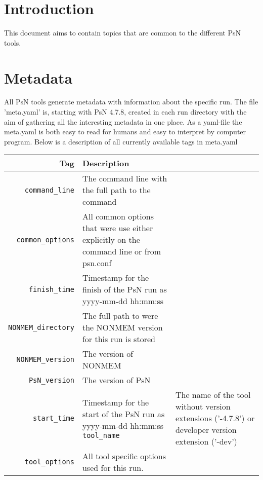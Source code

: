 

\usepackage{tabularx}





\maketitle
\newcommand{\guidetoolname}{<toolname>}

\section{Introduction}
This document aims to contain topics that are common to the different PsN tools.

\section{Metadata}
All PsN tools generate metadata with information about the specific run. The file 'meta.yaml' is, starting with PsN 4.7.8, created in each run directory with the aim of gathering all the interesting metadata in one place. As a yaml-file the meta.yaml is both easy to read for humans and easy to interpret by computer program. Below is a description of all currently available tags in meta.yaml

\begin{center}
    \begin{tabularx}{\linewidth}{ r X }
    \hline
    Tag & Description \\ \hline
    \verb|command_line| & The command line with the full path to the command \\ \hline
    \verb|common_options| & All common options that were use either explicitly on the command line or from psn.conf \\ \hline
    \verb|finish_time| & Timestamp for the finish of the PsN run as yyyy-mm-dd hh:mm:ss \\ \hline
    \verb|NONMEM_directory| & The full path to were the NONMEM version for this run is stored \\ \hline
    \verb|NONMEM_version| & The version of NONMEM \\ \hline
    \verb|PsN_version| & The version of PsN \\ \hline
    \verb|start_time| & Timestamp for the start of the PsN run as yyyy-mm-dd hh:mm:ss
    \verb|tool_name| & The name of the tool without version extensions \mbox{('-4.7.8')} or developer version extension ('-dev') \\ \hline
    \verb|tool_options| & All tool specific options used for this run.
  \end{tabularx}
\end{center}


